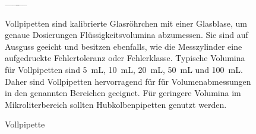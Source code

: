 \begin{figure}[h!]
	\begin{minipage}[t]{0.25\textwidth}
		\vspace{0pt}
		\centering
		\includegraphics[angle=90,width=0.088\textwidth]{img/vollpipette}
		\caption{Vollpipette}
		\label{fig:vollpipette}
	\end{minipage}
	\hfill
	\hspace{1mm}
	\begin{minipage}[t]{0.75\textwidth}
		\vspace{0pt}
		Vollpipetten sind kalibrierte Glasröhrchen mit einer Glasblase, um genaue Dosierungen Flüssigkeitsvolumina abzumessen.  Sie sind auf Ausguss geeicht und besitzen ebenfalls, wie die Messzylinder eine aufgedruckte Fehlertoleranz oder Fehlerklasse. Typische Volumina für Vollpipetten sind \SI{5}{\milli \liter}, \SI{10}{\milli \liter}, \SI{20}{\milli \liter }, \SI{50}{\milli \liter } und \SI{100}{\milli \liter}. Daher sind Vollpipetten hervorragend für für Volumenabmessungen in den genannten Bereichen geeignet. Für geringere Volumina im Mikroliterbereich sollten Hubkolbenpipetten genutzt werden.
	\end{minipage}
\end{figure}
\FloatBarrier

